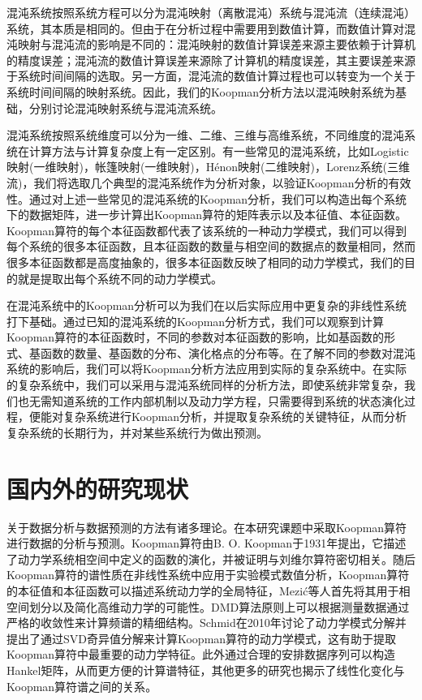 混沌系统按照系统方程可以分为混沌映射（离散混沌）系统与混沌流（连续混沌）系统，其本质是相同的。但由于在分析过程中需要用到数值计算，而数值计算对混沌映射与混沌流的影响是不同的：混沌映射的数值计算误差来源主要依赖于计算机的精度误差；混沌流的数值计算误差来源除了计算机的精度误差，其主要误差来源于系统时间间隔的选取。另一方面，混沌流的数值计算过程也可以转变为一个关于系统时间间隔的映射系统\cite{strogatz2001nonlinear}。因此，我们的Koopman分析方法以混沌映射系统为基础，分别讨论混沌映射系统与混沌流系统。

混沌系统按照系统维度可以分为一维、二维、三维与高维系统，不同维度的混沌系统在计算方法与计算复杂度上有一定区别。有一些常见的混沌系统，比如Logistic映射\cite{phatak1995logistic}(一维映射)，帐篷映射\cite{yoshida1983analytic}(一维映射)，H\'{e}non映射\cite{henon1976two}(二维映射)，Lorenz系统\cite{lorenz1963deterministic}(三维流)，我们将选取几个典型的混沌系统作为分析对象，以验证Koopman分析的有效性。通过对上述一些常见的混沌系统的Koopman分析，我们可以构造出每个系统下的数据矩阵，进一步计算出Koopman算符的矩阵表示以及本征值、本征函数。Koopman算符的每个本征函数都代表了该系统的一种动力学模式，我们可以得到每个系统的很多本征函数，且本征函数的数量与相空间的数据点的数量相同，然而很多本征函数都是高度抽象的，很多本征函数反映了相同的动力学模式，我们的目的就是提取出每个系统不同的动力学模式。

在混沌系统中的Koopman分析可以为我们在以后实际应用中更复杂的非线性系统打下基础。通过已知的混沌系统的Koopman分析方式，我们可以观察到计算Koopman算符的本征函数时，不同的参数对本征函数的影响，比如基函数的形式、基函数的数量、基函数的分布、演化格点的分布等。在了解不同的参数对混沌系统的影响后，我们可以将Koopman分析方法应用到实际的复杂系统中。在实际的复杂系统中，我们可以采用与混沌系统同样的分析方法，即使系统非常复杂，我们也无需知道系统的工作内部机制以及动力学方程，只需要得到系统的状态演化过程，便能对复杂系统进行Koopman分析，并提取复杂系统的关键特征，从而分析复杂系统的长期行为，并对某些系统行为做出预测。

\section{国内外的研究现状}
关于数据分析与数据预测的方法有诸多理论。在本研究课题中采取Koopman算符进行数据的分析与预测。Koopman算符由B. O. Koopman于1931年提出\cite{koopman1931hamiltonian}，它描述了动力学系统相空间中定义的函数的演化，并被证明与刘维尔算符密切相关\cite{gaspard1995spectral,gaspard2001liouvillian}。随后Koopman算符的谱性质在非线性系统中应用于实验模式数值分析\cite{antoniou1997resonances,antoniou1998inverse,antoniou1999time}，Koopman算符的本征值和本征函数可以描述系统动力学的全局特征\cite{budivsic2012applied}，Mezi\'{c}等人首先将其用于相空间划分\cite{mezic2004comparison}以及简化高维动力学\cite{mezic2005spectral}的可能性。DMD算法\cite{schmid2010dynamic}原则上可以根据测量数据通过严格的收敛性来计算频谱的精细结构\cite{korda2020data}。Schmid在2010年讨论了动力学模式分解并提出了通过SVD奇异值分解来计算Koopman算符的动力学模式\cite{schmid2010dynamic}，这有助于提取Koopman算符中最重要的动力学特征。此外通过合理的安排数据序列可以构造Hankel矩阵\cite{arbabi2017ergodic,brunton2017chaos}，从而更方便的计算谱特征，其他更多的研究也揭示了线性化变化与Koopman算符谱之间的关系\cite{lan2013linearization}。

